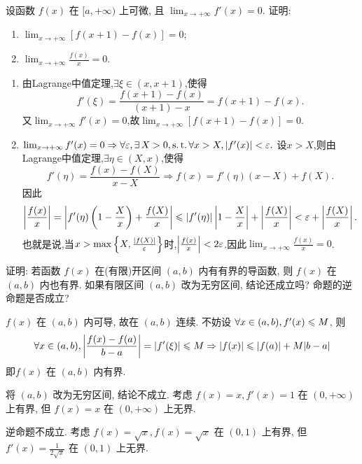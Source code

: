 \begin{exercise}[3.3.10]
    设函数 $f(x)$ 在 $[a, +\infty)$ 上可微, 且 $\lim_{x \to +\infty} f'(x) = 0$. 证明:
    \begin{enumerate}
        \item $\lim_{x \to +\infty} [f(x+1)-f(x)] = 0$;
        \item $\lim_{x \to +\infty} \frac{f(x)}{x} = 0$.
    \end{enumerate}
\end{exercise}

\begin{solution}
    \begin{enumerate}
        \item 由Lagrange中值定理,$\exists \xi \in (x,x+1)$,使得
              $$
                  f'(\xi) = \frac{f(x+1)-f(x)}{(x+1)-x} = f(x+1)-f(x).
              $$
              又$\lim_{x \to +\infty} f'(x) = 0$,故$\lim_{x \to +\infty} [f(x+1)-f(x)] = 0$.
        \item $\lim_{x \to +\infty} f'(x) = 0 \Rightarrow \forall \ve, \exists X > 0 , \st \forall x > X, |f'(x)| < \ve.$
              设$x > X$,则由Lagrange中值定理,$\exists \eta \in (X,x)$,使得
              $$
                  f'(\eta) = \frac{f(x)-f(X)}{x-X} \Rightarrow f(x) = f'(\eta)(x-X) + f(X).
              $$
              因此
              $$
                  \left|\frac{f(x)}{x}\right| = \left|f'(\eta)\left(1-\frac{X}{x}\right) + \frac{f(X)}{x}\right| \leqslant |f'(\eta)|\left|1-\frac{X}{x}\right| + \left|\frac{f(X)}{x}\right| < \varepsilon + \left| \frac{f(X)}{x}\right|.
              $$
              也就是说,当$x > \max\left\{X, \frac{|f(X)|}{\varepsilon}\right\}$时,$\left|\frac{f(x)}{x}\right| < 2\varepsilon$.因此$\lim_{x \to +\infty} \frac{f(x)}{x} = 0$.
    \end{enumerate}
\end{solution}

\begin{exercise}[3.3.11]
    证明: 若函数 $f(x)$ 在(有限)开区间 $(a,b)$ 内有有界的导函数, 则 $f(x)$ 在 $(a,b)$ 内也有界. 如果有限区间 $(a,b)$ 改为无穷区间, 结论还成立吗? 命题的逆命题是否成立?
\end{exercise}

\begin{solution}
    $f(x)$ 在 $(a, b)$ 内可导, 故在 $(a, b)$ 连续.
    不妨设 $\forall x \in (a, b), f'(x) \leqslant M$, 则
    $$ \forall x \in (a, b), \left|\frac{f(x) - f(a)}{b-a}\right| = |f'(\xi)| \leqslant M \Rightarrow |f(x)| \leqslant |f(a)| + M|b-a| $$
    即$ f(x)$ 在 $(a, b)$ 内有界.

    将 $(a, b)$ 改为无穷区间, 结论不成立. 考虑 $f(x) = x, f'(x) = 1$ 在 $(0, +\infty)$ 上有界, 但 $f(x) = x$ 在 $(0, +\infty)$ 上无界.

    逆命题不成立. 考虑 $f(x) = \sqrt{x}, f(x) = \sqrt{x}$ 在 $(0, 1)$ 上有界, 但 $f'(x) = \frac{1}{2\sqrt{x}}$ 在 $(0, 1)$ 上无界.
\end{solution}

